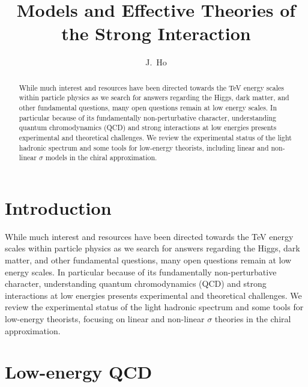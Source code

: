 \documentclass[aps,prd,onecolumn,showpacs,amsmath,amssymb,nofootinbib, 11pt]{revtex4} \pdfoutput=1
\begin{document}
\title{Models and Effective Theories of the Strong Interaction}

\author{J.~Ho}

\begin{abstract}
While much interest and resources have been directed towards the TeV energy scales within particle physics as we search for answers regarding the Higgs, dark matter, and other fundamental questions, many open questions remain at low energy scales. In particular because of its fundamentally non-perturbative character, understanding quantum chromodynamics (QCD) and strong interactions at low energies presents experimental and theoretical challenges. We review the experimental status of the light hadronic spectrum and some tools for low-energy theorists, including linear and non-linear $\sigma$ models in the chiral approximation.
\end{abstract}
\maketitle
\section{Introduction}\label{I}
While much interest and resources have been directed towards the TeV energy scales within particle physics as we search for answers regarding the Higgs, dark matter, and other fundamental questions, many open questions remain at low energy scales. In particular because of its fundamentally non-perturbative character, understanding quantum chromodynamics (QCD) and strong interactions at low energies presents experimental and theoretical challenges. We review the experimental status of the light hadronic spectrum and some tools for low-energy theorists, focusing on linear and non-linear $\sigma$ theories in the chiral approximation.


\section{Low-energy QCD}\label{II}
\end{document}
